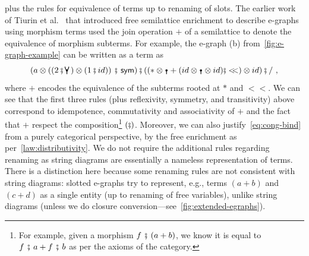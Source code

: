 	plus the rules for equivalence of terms up to renaming of slots.
	The earlier work of Tiurin et al.~\cite{tiurin2025equivalencehypergraphsdporewriting} that introduced free semilattice enrichment to describe e-graphs using morphism terms used the join operation $+$ of a semilattice to denote the equivalence of morphism subterms.
	For example, the e-graph (b) from~\autoref{fig:e-graph-example} can be written as a term as
	\[(a \otimes ((2\fatsemi\comonoid) \otimes (1\fatsemi id))\,\fatsemi\,\sym)\fatsemi((* \otimes \counit + (id \otimes \counit \otimes id)\fatsemi<\!\!<) \otimes id)\fatsemi/~,\] where $+$ encodes the equivalence of the subterms rooted at $*$ and $<\!\!<$.
	We can see that the first three rules (plus reflexivity, symmetry, and transitivity) above correspond to idempotence, commutativity and associativity of $+$ and the fact that $+$ respect the composition\footnote{For example, given a morphism $f\,\fatsemi\,(a + b)$, we know it is equal to $f\,\fatsemi\,a + f\,\fatsemi\,b$ as per the axioms of the category.} $(\fatsemi)$.
	Moreover, we can also justify~\autoref{eq:cong-bind} from a purely categorical perspective, by the free enrichment as per~\autoref{law:distributivity}.
	We do not require the additional rules regarding renaming as string diagrams are essentially a nameless representation of terms.
	There is a distinction here because some renaming rules are not consistent with string diagrams: slotted e-graphs try to represent, e.g., terms $(a + b)$ and $(c + d)$ as a single entity (up to renaming of free variables), unlike string diagrams (unless we do closure conversion---see~\autoref{fig:extended-egraphs}).


